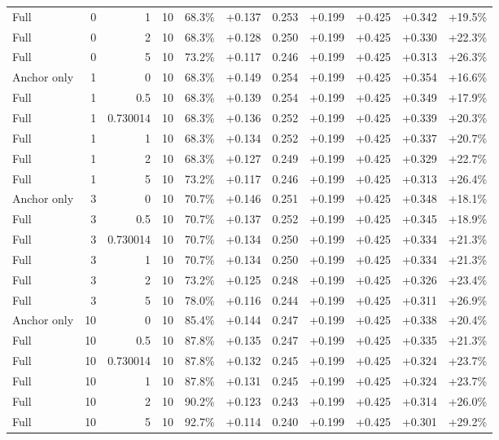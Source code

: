 \begin{table}[htbp]
\begin{tabular}{lrrrccccccc}
Full & 0 & 1 & 10 & 68.3\% & +0.137 & 0.253 & +0.199 & +0.425 & +0.342 & +19.5\% \\
Full & 0 & 2 & 10 & 68.3\% & +0.128 & 0.250 & +0.199 & +0.425 & +0.330 & +22.3\% \\
Full & 0 & 5 & 10 & 73.2\% & +0.117 & 0.246 & +0.199 & +0.425 & +0.313 & +26.3\% \\
Anchor only & 1 & 0 & 10 & 68.3\% & +0.149 & 0.254 & +0.199 & +0.425 & +0.354 & +16.6\% \\
Full & 1 & 0.5 & 10 & 68.3\% & +0.139 & 0.254 & +0.199 & +0.425 & +0.349 & +17.9\% \\
Full & 1 & 0.730014 & 10 & 68.3\% & +0.136 & 0.252 & +0.199 & +0.425 & +0.339 & +20.3\% \\
Full & 1 & 1 & 10 & 68.3\% & +0.134 & 0.252 & +0.199 & +0.425 & +0.337 & +20.7\% \\
Full & 1 & 2 & 10 & 68.3\% & +0.127 & 0.249 & +0.199 & +0.425 & +0.329 & +22.7\% \\
Full & 1 & 5 & 10 & 73.2\% & +0.117 & 0.246 & +0.199 & +0.425 & +0.313 & +26.4\% \\
Anchor only & 3 & 0 & 10 & 70.7\% & +0.146 & 0.251 & +0.199 & +0.425 & +0.348 & +18.1\% \\
Full & 3 & 0.5 & 10 & 70.7\% & +0.137 & 0.252 & +0.199 & +0.425 & +0.345 & +18.9\% \\
Full & 3 & 0.730014 & 10 & 70.7\% & +0.134 & 0.250 & +0.199 & +0.425 & +0.334 & +21.3\% \\
Full & 3 & 1 & 10 & 70.7\% & +0.134 & 0.250 & +0.199 & +0.425 & +0.334 & +21.3\% \\
Full & 3 & 2 & 10 & 73.2\% & +0.125 & 0.248 & +0.199 & +0.425 & +0.326 & +23.4\% \\
Full & 3 & 5 & 10 & 78.0\% & +0.116 & 0.244 & +0.199 & +0.425 & +0.311 & +26.9\% \\
Anchor only & 10 & 0 & 10 & 85.4\% & +0.144 & 0.247 & +0.199 & +0.425 & +0.338 & +20.4\% \\
Full & 10 & 0.5 & 10 & 87.8\% & +0.135 & 0.247 & +0.199 & +0.425 & +0.335 & +21.3\% \\
Full & 10 & 0.730014 & 10 & 87.8\% & +0.132 & 0.245 & +0.199 & +0.425 & +0.324 & +23.7\% \\
Full & 10 & 1 & 10 & 87.8\% & +0.131 & 0.245 & +0.199 & +0.425 & +0.324 & +23.7\% \\
Full & 10 & 2 & 10 & 90.2\% & +0.123 & 0.243 & +0.199 & +0.425 & +0.314 & +26.0\% \\
Full & 10 & 5 & 10 & 92.7\% & +0.114 & 0.240 & +0.199 & +0.425 & +0.301 & +29.2\% \\

\end{tabular}
\end{table}
